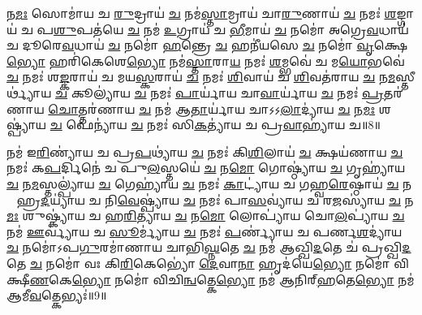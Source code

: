 𑌨\ul{𑌮𑌃} 𑌸𑍋𑌮𑌾॑𑌯 𑌚 \ul{𑌰𑍁}𑌦𑍍𑌰𑌾𑌯॑ \ul{𑌚} 𑌨𑌮॑\ul{𑌸𑍍𑌤𑌾}𑌮𑍍𑌰𑌾𑌯॑ 𑌚𑌾\ul{𑌰𑍁}𑌣𑌾𑌯॑ \ul{𑌚} 𑌨𑌮𑌃॑ \ul{𑌶}𑌙𑍍𑌗𑌾𑌯॑ 𑌚 𑌪\ul{𑌶𑍁}𑌪𑌤॑𑌯𑍇 \ul{𑌚} 𑌨𑌮॑ \ul{𑌉}𑌗𑍍𑌰𑌾𑌯॑ 𑌚 \ul{𑌭𑍀}𑌮𑌾𑌯॑ \ul{𑌚} 𑌨𑌮𑍋॑ 𑌅𑌗𑍍𑌰𑍇\ul{𑌵}𑌧𑌾𑌯॑ 𑌚 𑌦𑍂𑌰𑍇\ul{𑌵}𑌧𑌾𑌯॑ \ul{𑌚} 𑌨𑌮𑍋॑ \ul{𑌹}𑌨𑍍𑌤𑍍𑌰𑍇 \ul{𑌚} 𑌹𑌨𑍀॑𑌯𑌸𑍇 \ul{𑌚} 𑌨𑌮𑍋॑ \ul{𑌵𑍃}𑌕𑍍𑌷𑍇\ul{𑌭𑍍𑌯𑍋} 𑌹𑌰𑌿॑𑌕𑍇𑌶𑍇\ul{𑌭𑍍𑌯𑍋} 𑌨𑌮॑\ul{𑌸𑍍𑌤𑌾}𑌰𑌾\ul{𑌯} 𑌨𑌮𑌃॑  \ul{𑌶}𑌮𑍍𑌭𑌵𑍇॑ 𑌚 𑌮\ul{𑌯𑍋}𑌭𑌵𑍇॑ \ul{𑌚} 𑌨𑌮𑌃॑ 𑌶\ul{𑌙𑍍𑌕}𑌰𑌾𑌯॑ 𑌚 𑌮𑌯\ul{𑌸𑍍𑌕}𑌰𑌾𑌯॑ \ul{𑌚} 𑌨𑌮𑌃॑ \ul{𑌶𑌿}𑌵𑌾𑌯॑ 𑌚 \ul{𑌶𑌿}𑌵𑌤॑𑌰𑌾𑌯 \ul{𑌚} 𑌨\ul{𑌮}𑌸𑍍𑌤𑍀𑌰𑍍𑌥𑍍𑌯𑌾॑𑌯 \ul{𑌚} 𑌕𑍂𑌲𑍍𑌯𑌾॑𑌯 \ul{𑌚} 𑌨𑌮𑌃॑ \ul{𑌪𑌾}𑌰𑍍𑌯𑌾॑𑌯 𑌚𑌾\ul{𑌵𑌾}𑌰𑍍𑌯𑌾॑𑌯 \ul{𑌚} 𑌨𑌮𑌃॑ \ul{𑌪𑍍𑌰}𑌤𑌰॑𑌣𑌾𑌯 \ul{𑌚𑍋}𑌤𑍍𑌤𑌰॑𑌣𑌾𑌯 \ul{𑌚} 𑌨𑌮॑ 𑌆\ul{𑌤𑌾}𑌰𑍍𑌯𑌾॑𑌯 𑌚𑌾𑌽𑌽\ul{𑌲𑌾}𑌦𑍍𑌯𑌾॑𑌯 \ul{𑌚} 𑌨\ul{𑌮𑌃} 𑌶𑌷𑍍𑌪𑍍𑌯𑌾॑𑌯 \ul{𑌚} 𑌫𑍇𑌨𑍍𑌯𑌾॑𑌯 \ul{𑌚} 𑌨𑌮𑌃॑ 𑌸𑌿\ul{𑌕}𑌤𑍍𑌯𑌾॑𑌯 𑌚 𑌪𑍍𑌰\ul{𑌵𑌾}𑌹𑍍𑌯𑌾॑𑌯 𑌚॥8॥ 

𑌨𑌮॑ 𑌇\ul{𑌰𑌿}𑌣𑍍𑌯𑌾॑𑌯 𑌚 𑌪𑍍𑌰\ul{𑌪}𑌥𑍍𑌯𑌾॑𑌯 \ul{𑌚} 𑌨𑌮𑌃॑ 𑌕𑌿\ul{𑌶𑌿}𑌲𑌾𑌯॑ \ul{𑌚} 𑌕𑍍𑌷𑌯॑𑌣𑌾𑌯 \ul{𑌚} 𑌨𑌮𑌃॑ 𑌕\ul{𑌪}𑌰𑍍𑌦𑌿𑌨𑍇॑ 𑌚 𑌪𑍁\ul{𑌲}𑌸𑍍𑌤𑌯𑍇॑ \ul{𑌚} 𑌨\ul{𑌮𑍋} 𑌗𑍋𑌷𑍍𑌠𑍍𑌯𑌾॑𑌯 \ul{𑌚} 𑌗𑍃𑌹𑍍𑌯𑌾॑𑌯 \ul{𑌚} 𑌨\ul{𑌮}𑌸𑍍𑌤𑌲𑍍𑌪𑍍𑌯𑌾॑𑌯 \ul{𑌚} 𑌗𑍇𑌹𑍍𑌯𑌾॑𑌯 \ul{𑌚} 𑌨𑌮𑌃॑ \ul{𑌕𑌾}𑌟𑍍𑌯𑌾॑𑌯 𑌚 𑌗𑌹𑍍𑌵\ul{𑌰𑍇}𑌷𑍍𑌠𑌾𑌯॑ \ul{𑌚} 𑌨𑌮𑍋᳚ 𑌹𑍍𑌰\ul{𑌦}𑌯𑍍𑌯𑌾॑𑌯 𑌚 𑌨𑌿\ul{𑌵𑍇}𑌷𑍍𑌪𑍍𑌯𑌾॑𑌯 \ul{𑌚} 𑌨𑌮𑌃॑ 𑌪𑌾\ul{𑌸}𑌵𑍍𑌯𑌾॑𑌯 𑌚 𑌰\ul{𑌜}𑌸𑍍𑌯𑌾॑𑌯 \ul{𑌚} 𑌨\ul{𑌮𑌃} 𑌶𑍁𑌷𑍍𑌕𑍍𑌯𑌾॑𑌯 𑌚 𑌹\ul{𑌰𑌿}𑌤𑍍𑌯𑌾॑𑌯 \ul{𑌚} 𑌨\ul{𑌮𑍋} 𑌲𑍋𑌪𑍍𑌯𑌾॑𑌯 𑌚𑍋\ul{𑌲}𑌪𑍍𑌯𑌾॑𑌯 \ul{𑌚} 𑌨𑌮॑ \ul{𑌊}𑌰𑍍𑌵𑍍𑌯𑌾॑𑌯 𑌚 \ul{𑌸𑍂}𑌰𑍍𑌮𑍍𑌯𑌾॑𑌯 \ul{𑌚} 𑌨𑌮𑌃॑ \ul{𑌪}𑌰𑍍𑌣𑍍𑌯𑌾॑𑌯 𑌚 𑌪𑌰𑍍𑌣\ul{𑌶}𑌦𑍍𑌯𑌾॑𑌯 \ul{𑌚} 𑌨𑌮𑍋॑𑌽𑌪\ul{𑌗𑍁}𑌰𑌮𑌾॑𑌣𑌾𑌯 𑌚𑌾𑌭𑌿\ul{𑌘𑍍𑌨}𑌤𑍇 \ul{𑌚} 𑌨𑌮॑ 𑌆𑌖𑍍𑌖𑌿\ul{𑌦}𑌤𑍇 𑌚॑ 𑌪𑍍𑌰𑌖𑍍𑌖𑌿\ul{𑌦}𑌤𑍇 \ul{𑌚} 𑌨𑌮𑍋॑ 𑌵𑌃 𑌕𑌿\ul{𑌰𑌿}𑌕𑍇𑌭𑍍𑌯𑍋॑ \ul{𑌦𑍇}𑌵𑌾\ul{𑌨𑌾}\ul{} 𑌹𑍃𑌦॑𑌯𑍇\ul{𑌭𑍍𑌯𑍋} 𑌨𑌮𑍋॑ 𑌵𑌿𑌕𑍍𑌷𑍀\ul{𑌣}𑌕𑍇\ul{𑌭𑍍𑌯𑍋} 𑌨𑌮𑍋॑ 𑌵𑌿𑌚𑌿\ul{𑌨𑍍𑌵}𑌤𑍍𑌕𑍇\ul{𑌭𑍍𑌯𑍋} 𑌨𑌮॑ 𑌆𑌨𑌿𑌰𑍍‌\ul{𑌹}𑌤𑍇\ul{𑌭𑍍𑌯𑍋} 𑌨𑌮॑ 𑌆𑌮𑍀\ul{𑌵}𑌤𑍍𑌕𑍇𑌭𑍍𑌯𑌃॑॥9॥ 

